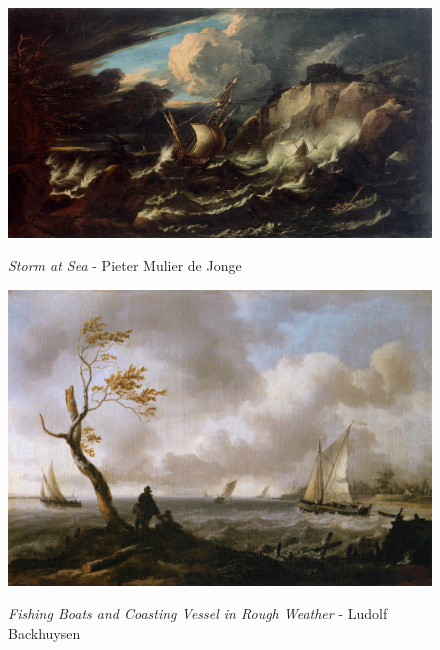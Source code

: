 \documentclass[a4paper]{article}
\begin{document}
\begin {figure}[h!]
\centering
\begin{minipage}[b]{.49\textwidth}
	\centering
	\includegraphics[width=\textwidth]{SeaPaintings/_Wth__mulierjongestormatsea.jpg}
    \caption{\emph{Storm at Sea} - Pieter Mulier de Jonge}
\end{minipage}
\hfill
\begin{minipage}[b]{.49\textwidth}
	\centering
	\includegraphics[width=\textwidth]{SeaPaintings/_Wth__backhuysenroughwater.jpg}
    \caption{\emph{Fishing Boats and Coasting Vessel in Rough Weather} - Ludolf Backhuysen}
\end{minipage}
\end{figure}
\end{document}

